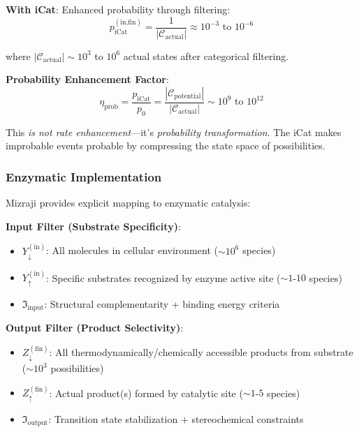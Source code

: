\documentclass[11pt,a4paper]{article}
\begin{document}
\textbf{With iCat}: Enhanced probability through filtering:
\begin{equation}
p_{\text{iCat}}^{(\text{in,fin})} = \frac{1}{|\mathcal{C}_{\text{actual}}|} \approx 10^{-3} \text{ to } 10^{-6}
\end{equation}

where $|\mathcal{C}_{\text{actual}}| \sim 10^3$ to $10^6$ actual states after categorical filtering.

\textbf{Probability Enhancement Factor}:
\begin{equation}
\eta_{\text{prob}} = \frac{p_{\text{iCat}}}{p_0} = \frac{|\mathcal{C}_{\text{potential}}|}{|\mathcal{C}_{\text{actual}}|} \sim 10^9 \text{ to } 10^{12}
\end{equation}

This \textit{is not rate enhancement}—it's \textit{probability transformation}. The iCat makes improbable events probable by compressing the state space of possibilities.

\subsubsection{Enzymatic Implementation}

Mizraji provides explicit mapping to enzymatic catalysis\cite{mizraji2021biological}:

\textbf{Input Filter (Substrate Specificity)}:
\begin{itemize}
\item $Y_{\downarrow}^{(\text{in})}$: All molecules in cellular environment ($\sim 10^6$ species)
\item $Y_{\uparrow}^{(\text{in})}$: Specific substrates recognized by enzyme active site ($\sim 1$-$10$ species)
\item $\Im_{\text{input}}$: Structural complementarity + binding energy criteria
\end{itemize}

\textbf{Output Filter (Product Selectivity)}:
\begin{itemize}
\item $Z_{\downarrow}^{(\text{fin})}$: All thermodynamically/chemically accessible products from substrate ($\sim 10^3$ possibilities)
\item $Z_{\uparrow}^{(\text{fin})}$: Actual product(s) formed by catalytic site ($\sim 1$-$5$ species)
\item $\Im_{\text{output}}$: Transition state stabilization + stereochemical constraints
\end{itemize}
\end{document}
